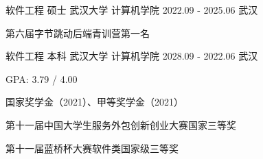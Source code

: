 

\begin{cventries}

  \cventry
    {软件工程 \quad 硕士} %
    {武汉大学 \quad 计算机学院} %
    {2022.09 - 2025.06} %
    {武汉} %
    {
      \begin{cvitems} %
        \item {第六届字节跳动后端青训营第一名}
      \end{cvitems}
    }

  \cventry
    {软件工程 \quad 本科} %
    {武汉大学 \quad 计算机学院} %
    {2028.09 - 2022.06} %
    {武汉} %
    {
      \begin{cvitems} %
        \item {GPA: 3.79 / 4.00}
        \item {国家奖学金（2021）、甲等奖学金（2021）}
        \item {第十一届中国大学生服务外包创新创业大赛国家三等奖}
        \item {第十一届蓝桥杯大赛软件类国家级三等奖}
      \end{cvitems}
    }

\end{cventries}
